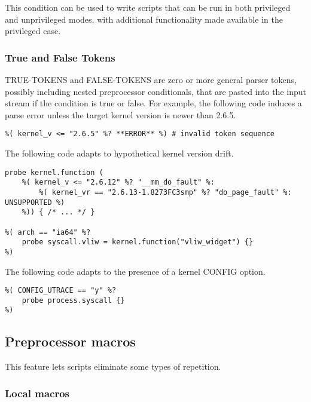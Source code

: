 \documentclass[twoside,english]{article}
\newenvironment{vindent}
{\begin{list}{}{\setlength{\listparindent}{6pt}}
\item[]}
{\end{list}}
\begin{document}
This condition can be used to write scripts that can be run in both
privileged and unprivileged modes, with additional functionality made
available in the privileged case.

\subsubsection{True and False Tokens}
TRUE-TOKENS and FALSE-TOKENS are zero or more general parser tokens, possibly
including nested preprocessor conditionals, that are pasted into the input
stream if the condition is true or false. For example, the following code
induces a parse error unless the target kernel version is newer than 2.6.5.

\begin{vindent}
\begin{verbatim}
%( kernel_v <= "2.6.5" %? **ERROR** %) # invalid token sequence
\end{verbatim}
\end{vindent}
The following code adapts to hypothetical kernel version drift.

\begin{vindent}
\begin{verbatim}
probe kernel.function (
    %( kernel_v <= "2.6.12" %? "__mm_do_fault" %:
        %( kernel_vr == "2.6.13-1.8273FC3smp" %? "do_page_fault" %: UNSUPPORTED %)
    %)) { /* ... */ }

%( arch == "ia64" %?
    probe syscall.vliw = kernel.function("vliw_widget") {}
%)

\end{verbatim}
\end{vindent}

The following code adapts to the presence of a kernel CONFIG option.

\begin{vindent}
\begin{verbatim}
%( CONFIG_UTRACE == "y" %?
    probe process.syscall {}
%)
\end{verbatim}
\end{vindent}


\subsection{Preprocessor macros}

This feature lets scripts eliminate some types of repetition.

\subsubsection{Local macros}
\end{document}
